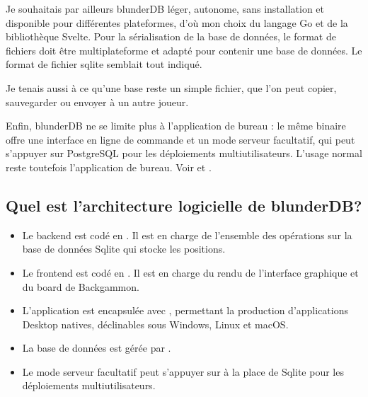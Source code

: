 \documentclass[letterpaper,10pt,french]{sphinxmanual}
\begin{document}
\sphinxAtStartPar
Je souhaitais par ailleurs blunderDB léger, autonome, sans installation et
disponible pour différentes plateformes,
d’où mon choix du langage Go et de la bibliothèque Svelte. Pour la
sérialisation de la base de données, le format de fichiers doit être
multi\sphinxhyphen{}plateforme et adapté pour contenir une base de données. Le format de
fichier sqlite semblait tout indiqué.

\sphinxAtStartPar
Je tenais aussi à ce qu’une base reste un simple fichier, que l’on peut copier,
sauvegarder ou envoyer à un autre joueur.

\sphinxAtStartPar
Enfin, blunderDB ne se limite plus à l’application de bureau : le même binaire
offre une interface en ligne de commande et un mode serveur facultatif, qui
peut s’appuyer sur PostgreSQL pour les déploiements multi\sphinxhyphen{}utilisateurs. L’usage
normal reste toutefois l’application de bureau. Voir {\hyperref[\detokenize{cli:cli}]{}} et
{\hyperref[\detokenize{mode_headless:headless}]{}}.


\subsection{Quel est l’architecture logicielle de blunderDB?}
\label{\detokenize{faq:quel-est-l-architecture-logicielle-de-blunderdb}}\begin{itemize}
\item {} 
\sphinxAtStartPar
Le backend est codé en . Il est en charge de
l’ensemble des opérations sur la base de données Sqlite qui stocke les
positions.

\item {} 
\sphinxAtStartPar
Le frontend est codé en . Il est en charge du
rendu de l’interface graphique et du board de Backgammon.

\item {} 
\sphinxAtStartPar
L’application est encapsulée avec , permettant la
production d’applications Desktop natives, déclinables sous Windows, Linux et
macOS.

\item {} 
\sphinxAtStartPar
La base de données est gérée par .

\item {} 
\sphinxAtStartPar
Le mode serveur facultatif peut s’appuyer sur  à la place de Sqlite pour les déploiements
multi\sphinxhyphen{}utilisateurs.

\end{itemize}
\end{document}
